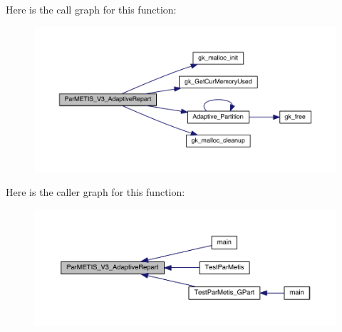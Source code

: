Here is the call graph for this function\+:\nopagebreak
\begin{figure}[H]
\begin{center}
\leavevmode
\includegraphics[width=350pt]{a00338_af584de3fd53c9e04d79f5037b546b9cc_cgraph}
\end{center}
\end{figure}
Here is the caller graph for this function\+:\nopagebreak
\begin{figure}[H]
\begin{center}
\leavevmode
\includegraphics[width=350pt]{a00338_af584de3fd53c9e04d79f5037b546b9cc_icgraph}
\end{center}
\end{figure}
